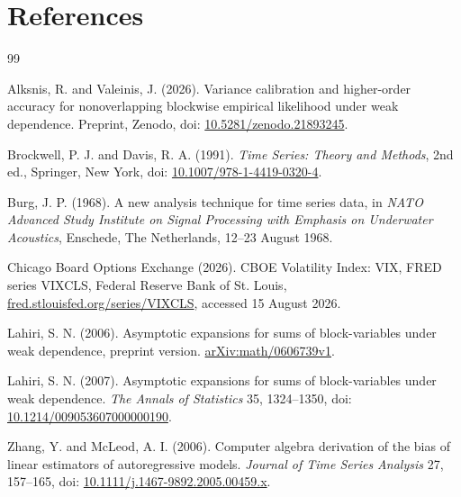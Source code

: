 \documentclass[12pt]{article}
\theoremstyle{remark}
\begin{document}
\section{References}
\begin{thebibliography}{99}

Alksnis, R. and Valeinis, J. (2026).
Variance calibration and higher-order accuracy for nonoverlapping blockwise empirical likelihood under weak dependence.
Preprint, Zenodo, doi: \href{https://doi.org/10.5281/zenodo.21893245}{10.5281/zenodo.21893245}.

Brockwell, P. J. and Davis, R. A. (1991).
\emph{Time Series: Theory and Methods}, 2nd ed., Springer, New York, doi: \href{https://doi.org/10.1007/978-1-4419-0320-4}{10.1007/978-1-4419-0320-4}.

Burg, J. P. (1968).
A new analysis technique for time series data, in \emph{NATO Advanced Study Institute on Signal Processing with Emphasis on Underwater Acoustics}, Enschede, The Netherlands, 12--23 August 1968.

Chicago Board Options Exchange (2026).
CBOE Volatility Index: VIX, FRED series VIXCLS, Federal Reserve Bank of St. Louis,
\href{https://fred.stlouisfed.org/series/VIXCLS}{fred.stlouisfed.org/series/VIXCLS},
accessed 15 August 2026.

Lahiri, S. N. (2006).
Asymptotic expansions for sums of block-variables under weak dependence, preprint version.
\href{https://arxiv.org/abs/math/0606739v1}{arXiv:math/0606739v1}.

Lahiri, S. N. (2007).
Asymptotic expansions for sums of block-variables under weak dependence.
\emph{The Annals of Statistics} 35, 1324--1350, doi: \href{https://doi.org/10.1214/009053607000000190}{10.1214/009053607000000190}.

Zhang, Y. and McLeod, A. I. (2006).
Computer algebra derivation of the bias of linear estimators of autoregressive models.
\emph{Journal of Time Series Analysis} 27, 157--165, doi: \href{https://doi.org/10.1111/j.1467-9892.2005.00459.x}{10.1111/j.1467-9892.2005.00459.x}.

\end{thebibliography}
\end{document}
